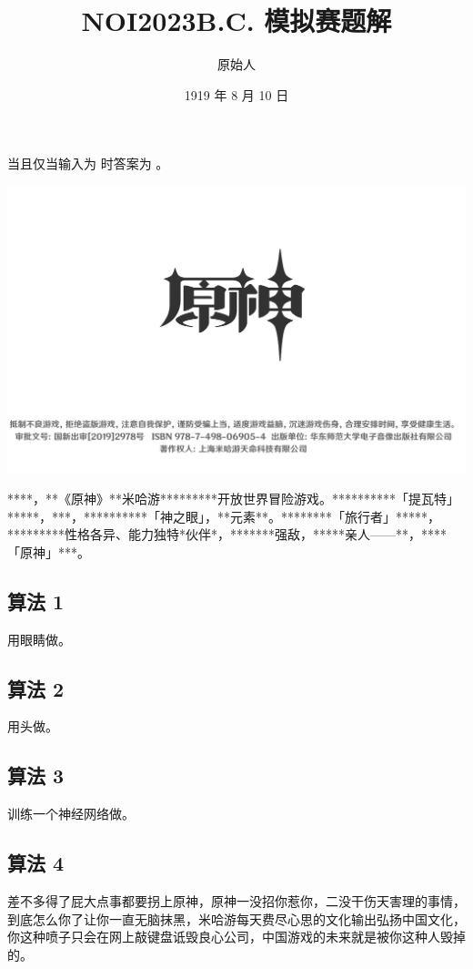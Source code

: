 \documentclass{oisolution}
\begin{document}
\title{NOI2023B.C. 模拟赛\quad 题解}
\author{原始人}
\date{1919 年 8 月 10 日}
\solutiontitle


当且仅当输入为  时答案为 。

\begin{center}
\href{https://genshin.gamemcu.com/}{\includegraphics[width=400pt,keepaspectratio]{launch.png}}
\end{center}


****，**《原神》**米哈游*********开放世界冒险游戏。**********「提瓦特」*****，***，**********「神之眼」，**元素**。********「旅行者」*****，*********性格各异、能力独特*伙伴*，*******强敌，*****亲人——**，****「原神」***。


\subsection[Algo 1]{算法 1}

用眼睛做。

\subsection[Algo 2]{算法 2}

用头做。

\subsection[Algo 3]{算法 3}

训练一个神经网络做。

\subsection[Algo 4]{算法 4}

差不多得了屁大点事都要拐上原神，原神一没招你惹你，二没干伤天害理的事情，到底怎么你了让你一直无脑抹黑，米哈游每天费尽心思的文化输出弘扬中国文化，你这种喷子只会在网上敲键盘诋毁良心公司，中国游戏的未来就是被你这种人毁掉的。
\end{document}
